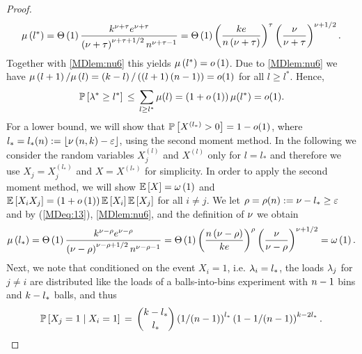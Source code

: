 \begin{proof}
\begin{align}
	\mu\left(l^\ast\right)=\Theta\left(1\right)\frac{k^{\nu+\tau}e^{\nu+\tau}}{\left(\nu+\tau\right)^{\nu+\tau+1/2}n^{\nu+\tau-1}}=\Theta\left(1\right)\left(\frac{k e}{n\left(\nu+\tau\right)}\right)^\tau\left(\frac{\nu}{\nu+\tau}\right)^{\nu+1/2}.
\end{align}
Together with \ref{MDlem:nu6} this yields $\mu\left(l^\ast\right)=o\left(1\right)$. Due to \ref{MDlem:nu6} we have $\mu\left(l+1\right)/\mu\left(l\right)=\left(k-l\right)/\left(\left(l+1\right)\left(n-1\right)\right)=o(1)$ for all $l\geq l^\ast$. Hence,
\begin{align*}
	\mathbb{P}\left[\lambda^\ast\geq l^\ast\right]\hspace{0.06cm}\leq\hspace{0.06cm} \sum_{l\geq l^\ast}\mu(l)=\left(1+o\left(1\right)\right)\mu(l^\ast)=o(1).
\end{align*}
For a lower bound, we will show that $\mathbb{P}\left[X^{\left(l_\ast\right)}>0\right]=1-o(1)$, where $l_\ast=l_\ast(n):=\left\lfloor\nu\left(n, k\right)-\varepsilon\right\rfloor$, using the second moment method. In the following we consider the random variables $X_j^{(l)}$ and $X^{(l)}$ only for $l=l_\ast$ and therefore we use $X_j=X_j^{\left(l_\ast\right)}$ and $X=X^{\left(l_\ast\right)}$ for simplicity. In order to apply the second moment method, we will show $\mathbb{E}\left[X\right]=\omega\left(1\right)$ and $\mathbb{E}\left[X_i X_j\right]=\left(1+o\left(1\right)\right)\mathbb{E}\left[X_i\right]\mathbb{E}\left[X_j\right]$ for all $i\neq j$. We let $\rho=\rho(n):=\nu-l_\ast\geq\varepsilon$ and by (\ref{MDeq:13}), \ref{MDlem:nu6}, and the definition of $\nu$ we obtain
\begin{align*}
	\mu\left(l_\ast\right)=\Theta\left(1\right)\frac{k^{\nu-\rho}e^{\nu-\rho}}{\left(\nu-\rho\right)^{\nu-\rho+1/2}n^{\nu-\rho-1}}=\Theta\left(1\right)\left(\frac{n\left(\nu-\rho\right)}{k e}\right)^\rho\left(\frac{\nu}{\nu-\rho}\right)^{\nu+1/2}=\omega\left(1\right).
\end{align*}
Next, we note that conditioned on the event $X_i=1$, i.e. $\lambda_i=l_\ast$, the loads $\lambda_j$ for $j\neq i$ are distributed like the loads of a balls-into-bins experiment with $n-1$ bins and $k-l_\ast$ balls, and thus
\begin{align*}
	\mathbb{P}\left[X_j=1 \;\middle|\; X_i=1\right]\hspace{0.06cm}=\hspace{0.06cm}\binom{k-l_\ast}{l_\ast}\left(1/(n-1)\right)^{l_\ast}\left(1-1/(n-1)\right)^{k-2l_\ast}.
\end{align*}

\end{proof}
